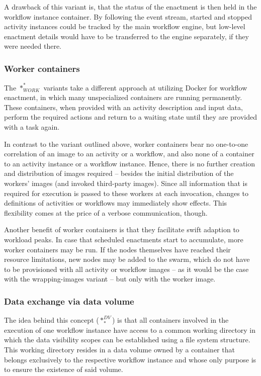     A drawback of this variant is, that the status of the enactment is then held in the workflow instance container. By following the event stream, started and stopped activity instances could be tracked by the main workflow engine, but low-level enactment details would have to be transferred to the engine separately, if they were needed there.

  \subsubsection{Worker containers} %
  \label{ssub:worker_containers}
    The $*_{WORK}^{*}$ variants take a different approach at utilizing Docker for workflow enactment, in which many unspecialized containers are running permanently. These containers, when provided with an activity description and input data, perform the required actions and return to a waiting state until they are provided with a task again.

    In contrast to the variant outlined above, worker containers bear no one-to-one correlation of an image to an activity or a workflow, and also none of a container to an activity instance or a workflow instance. Hence, there is no further creation and distribution of images required -- besides the initial distribution of the workers' images (and invoked third-party images).
    Since all information that is required for execution is passed to these workers at each invocation, changes to definitions of activities or workflows may immediately show effects. This flexibility comes at the price of a verbose communication, though.

    Another benefit of worker containers is that they facilitate swift adaption to workload peaks. In case that scheduled enactments start to accumulate, more worker containers may be run. If the nodes themselves have reached their resource limitations, new nodes may be added to the swarm, which do not have to be provisioned with all activity or workflow images -- as it would be the case with the wrapping-images variant -- but only with the worker image.

  \subsubsection{Data exchange via data volume} %
  \label{ssub:data_exchange_via_data_volume}
    The idea behind this concept ($*_{*}^{DV}$) is that all containers involved in the execution of one workflow instance have access to a common working directory in which the data visibility scopes can be established using a file system structure. This working directory resides in a data volume owned by a container that belongs exclusively to the respective workflow instance and whose only purpose is to ensure the existence of said volume.

